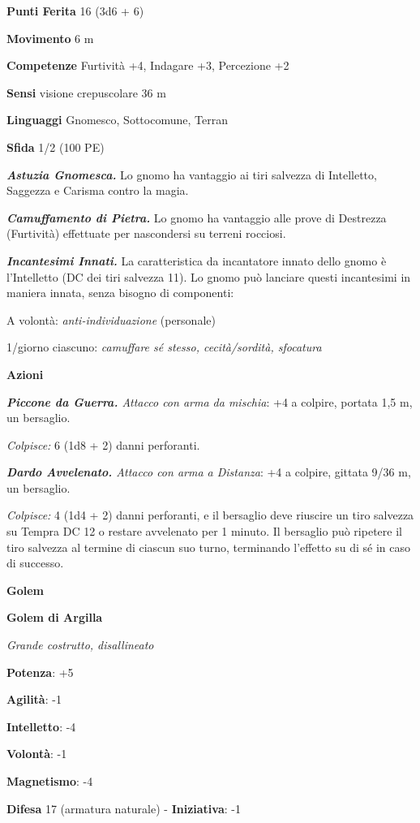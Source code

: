 \begin{multicols}{2}
\textbf{Punti Ferita} 16 (3d6 + 6)

\textbf{Movimento} 6 m

\textbf{Competenze} Furtività +4, Indagare +3, Percezione +2

\textbf{Sensi} visione crepuscolare 36 m

\textbf{Linguaggi} Gnomesco, Sottocomune, Terran

\textbf{Sfida} 1/2 (100 PE)

\emph{\textbf{Astuzia Gnomesca.}} Lo gnomo ha vantaggio ai tiri salvezza
di Intelletto, Saggezza e Carisma contro la magia.

\emph{\textbf{Camuffamento di Pietra.}} Lo gnomo ha vantaggio alle prove
di Destrezza (Furtività) effettuate per nascondersi su terreni rocciosi.

\emph{\textbf{Incantesimi Innati.}} La caratteristica da incantatore
innato dello gnomo è l'Intelletto (DC dei tiri salvezza 11). Lo gnomo
può lanciare questi incantesimi in maniera innata, senza bisogno di
componenti:

A volontà: \emph{anti-individuazione} (personale)

1/giorno ciascuno: \emph{camuffare sé stesso, cecità/sordità, sfocatura}

\textbf{Azioni}

\emph{\textbf{Piccone da Guerra.} Attacco con arma da mischia}: +4 a
colpire, portata 1,5 m, un bersaglio.

\emph{Colpisce:} 6 (1d8 + 2) danni perforanti.

\emph{\textbf{Dardo Avvelenato.} Attacco con arma a Distanza}: +4 a
colpire, gittata 9/36 m, un bersaglio.

\emph{Colpisce:} 4 (1d4 + 2) danni perforanti, e il bersaglio deve
riuscire un tiro salvezza su Tempra DC 12 o restare avvelenato per
1 minuto. Il bersaglio può ripetere il tiro salvezza al termine di
ciascun suo turno, terminando l'effetto su di sé in caso di successo.

\textbf{Golem}

\textbf{Golem di Argilla}

\emph{Grande costrutto, disallineato}

\textbf{Potenza}: +5

\textbf{Agilità}: -1

\textbf{Intelletto}: -4

\textbf{Volontà}: -1

\textbf{Magnetismo}: -4

\textbf{Difesa} 17 (armatura naturale) - \textbf{Iniziativa}: -1


\end{multicols}
